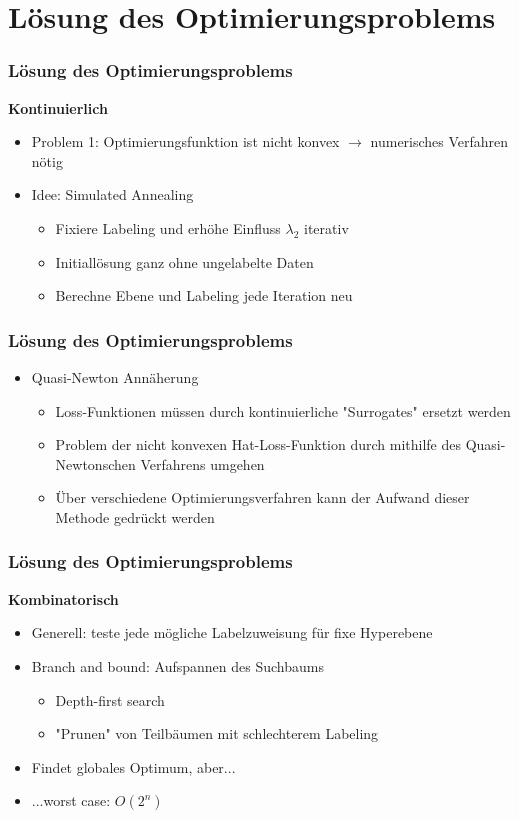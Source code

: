 \documentclass{beamer}
\begin{document}
\section{L\"osung des Optimierungsproblems}

\begin{frame}
	\frametitle{L\"osung des Optimierungsproblems}
	\textbf{Kontinuierlich}
	\begin{itemize}
		\item Problem 1: Optimierungsfunktion ist nicht konvex $\rightarrow$ numerisches Verfahren n\"otig
		\item Idee: Simulated Annealing
		\begin{itemize}
			\item Fixiere Labeling und erh\"ohe Einfluss $\lambda_2$ iterativ
			\item Initiall\"osung ganz ohne ungelabelte Daten
			\item Berechne Ebene und Labeling jede Iteration neu
		\end{itemize}
	\end{itemize}
\end{frame}

\begin{frame}
    \frametitle{L\"osung des Optimierungsproblems}
    \begin{itemize}
        \item Quasi-Newton Ann\"aherung
        \begin{itemize}
            \item Loss-Funktionen m\"ussen durch kontinuierliche "Surrogates" ersetzt werden
            \item Problem der nicht konvexen Hat-Loss-Funktion durch mithilfe des Quasi-Newtonschen Verfahrens umgehen
            \item \"Uber verschiedene Optimierungsverfahren kann der Aufwand dieser Methode gedr\"uckt werden
        \end{itemize}
    \end{itemize}
\end{frame}

\begin{frame}
    \frametitle{L\"osung des Optimierungsproblems}
    \textbf{Kombinatorisch}
    \begin{itemize}
        \item Generell: teste jede mögliche Labelzuweisung f\"ur fixe Hyperebene
        \item Branch and bound: Aufspannen des Suchbaums
        \begin{itemize}
        	\item Depth-first search
        	\item "Prunen" von Teilb\"aumen mit schlechterem Labeling
        \end{itemize}
        \item Findet globales Optimum, aber...
        \item ...worst case: $O(2^n)$
    \end{itemize}
\end{frame}
\end{document}
